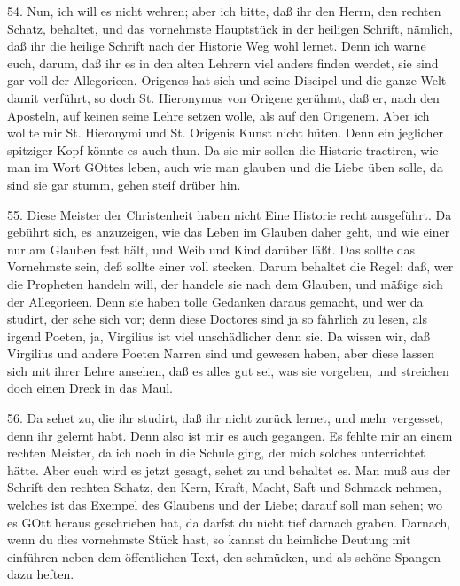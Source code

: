 54. Nun, ich will es nicht wehren; aber ich bitte, daß ihr den Herrn, den rechten Schatz, behaltet, und das vornehmste Hauptstück in der heiligen Schrift, nämlich, daß ihr die heilige Schrift nach der Historie Weg wohl lernet. Denn ich warne euch, darum, daß ihr es in den alten Lehrern viel anders finden werdet, sie sind gar voll der Allegorieen. Origenes hat sich und seine Discipel und die ganze Welt damit verführt, so doch St. Hieronymus von Origene gerühmt, daß er, nach den Aposteln, auf keinen seine Lehre setzen wolle, als auf den Origenem. Aber ich wollte mir St. Hieronymi und St. Origenis Kunst nicht hüten. Denn ein jeglicher spitziger Kopf könnte es auch thun. Da sie mir sollen die Historie tractiren, wie man im Wort GOttes leben, auch wie man glauben und die Liebe üben solle, da sind sie gar stumm, gehen steif drüber hin.

55. Diese Meister der Christenheit haben nicht Eine Historie recht ausgeführt. Da gebührt sich, es anzuzeigen, wie das Leben im Glauben daher geht, und wie einer nur am Glauben fest hält, und Weib und Kind darüber läßt. Das sollte das Vornehmste sein, deß sollte einer voll stecken. Darum behaltet die Regel: daß, wer die Propheten handeln will, der handele sie nach dem Glauben, und mäßige sich der Allegorieen. Denn sie haben tolle Gedanken daraus gemacht, und wer da studirt, der sehe sich vor; denn diese Doctores sind ja so fährlich zu lesen, als irgend Poeten, ja, Virgilius ist viel unschädlicher denn sie. Da wissen wir, daß Virgilius und andere Poeten Narren sind und gewesen haben, aber diese lassen sich mit ihrer Lehre ansehen, daß es alles gut sei, was sie vorgeben, und streichen doch einen Dreck in das Maul.

56. Da sehet zu, die ihr studirt, daß ihr nicht zurück lernet, und mehr vergesset, denn ihr gelernt habt. Denn also ist mir es auch gegangen. Es fehlte mir an einem rechten Meister, da ich noch in die Schule ging, der mich solches unterrichtet hätte. Aber euch wird es jetzt gesagt, sehet zu und behaltet es. Man muß aus der Schrift den rechten Schatz, den Kern, Kraft, Macht, Saft und Schmack nehmen, welches ist das Exempel des Glaubens und der Liebe; darauf soll man sehen; wo es GOtt heraus geschrieben hat, da darfst du nicht tief darnach graben. Darnach, wenn du dies vornehmste Stück hast, so kannst du heimliche Deutung mit einführen neben dem öffentlichen Text, den schmücken, und als schöne Spangen dazu heften.

